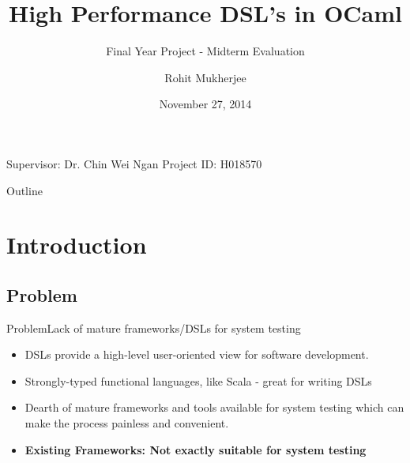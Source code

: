 \documentclass{beamer}
\title{High Performance DSL's in OCaml}
\subtitle{Final Year Project - Midterm Evaluation}
\author{Rohit Mukherjee}
\institute[National University of Singapore] %
\date{November 27, 2014}
\begin{document}
\begin{frame}
  \titlepage
  {Supervisor: Dr. Chin Wei Ngan}
  \newline{}
  {Project ID: H018570}
\end{frame}

\begin{frame}{Outline}
  \tableofcontents
\end{frame}

\section{Introduction}

\subsection{Problem}

\begin{frame}{Problem}{Lack of mature frameworks/DSLs for system testing}
  \begin{itemize}
  \item {
    DSLs provide a high-level user-oriented view for software development.
  }
  \item {
    Strongly-typed functional languages, like Scala - great for writing DSLs 
  }
  \item {
  Dearth of mature frameworks and tools available for system testing which can make the process painless and convenient. 
  }
  \item {
  \bf{Existing Frameworks:} Not exactly suitable for system testing
  }
  \end{itemize}
\end{frame}
\end{document}
